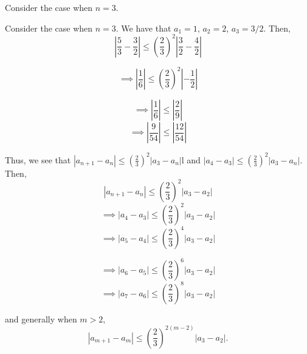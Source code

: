 \documentclass{report}
\begin{document}
\pagebreak


Consider the case when $n=3.$

\pagebreak
{}

\sol
Consider the case when $n=3.$ We have that $a_1 = 1$, $a_2 = 2$, $a_3 = 3/2.$  Then,
$$\left|\frac{5}{3} - \frac{3}{2} \right| \leq \left(\frac{2}{3} \right)^2 \left|\frac{3}{2} - \frac{4}{2} \right|$$

$$\implies \left|\frac{1}{6}  \right| \leq \left(\frac{2}{3} \right)^2 \left| - \frac{1}{2} \right|$$

$$\implies \left|\frac{1}{6}  \right| \leq \left|\frac{2}{9} \right|$$
$$\implies \left|\frac{9}{54}  \right| \leq \left|\frac{12}{54} \right|$$

Thus, we  see that $\left|a_{n+1} - a_n\right| \leq \left(\frac{2}{3}\right)^2 \left|a_3 -a_n\right|$l and $\left|a_{4} - a_3\right| \leq \left(\frac{2}{3}\right)^2 \left|a_3 -a_n\right|.$ Then,
$$\left|a_{n+1} - a_n\right| \leq \left(\frac{2}{3}\right)^2 \left|a_3 -a_2\right|$$
$$\implies \left|a_{4} - a_3\right| \leq \left(\frac{2}{3}\right)^2 \left|a_3 -a_2\right|$$
$$\implies \left|a_{5} - a_4\right| \leq \left(\frac{2}{3}\right)^4 \left|a_3 -a_2\right|$$

$$\implies \left|a_{6} - a_5\right| \leq \left(\frac{2}{3}\right)^6 \left|a_3 -a_2\right|$$
$$\implies \left|a_{7} - a_6\right| \leq \left(\frac{2}{3}\right)^8 \left|a_3 -a_2\right|$$

and generally when $m>2,$
$$ \left|a_{m+1} - a_m\right| \leq \left(\frac{2}{3}\right)^{2(m-2)} \left|a_3 -a_2\right|.$$
\pagebreak
{}
\end{document}
